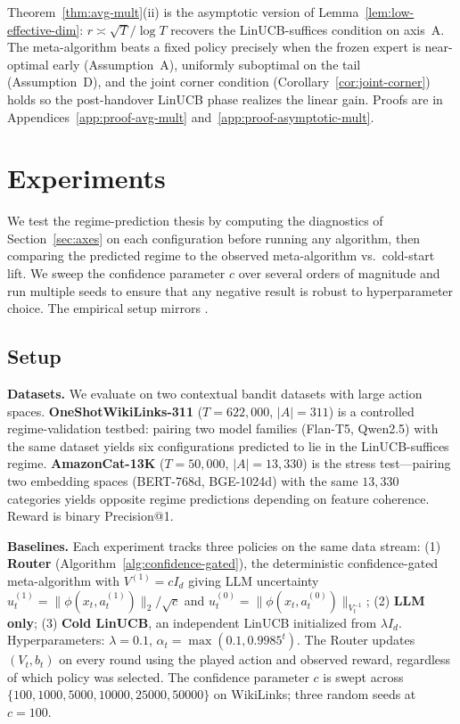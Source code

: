 \documentclass{article}
\theoremstyle{definition}
\theoremstyle{remark}
\theoremstyle{remark}
\begin{document}
Theorem~\ref{thm:avg-mult}(ii) is the asymptotic version of
Lemma~\ref{lem:low-effective-dim}: $r\!\asymp\!\sqrt T/\log T$ recovers the
LinUCB-suffices condition on axis~A. The meta-algorithm beats a fixed
policy precisely when the frozen expert is near-optimal early
(Assumption~A), uniformly suboptimal on the tail (Assumption~D), and the
joint corner condition (Corollary~\ref{cor:joint-corner}) holds so the
post-handover LinUCB phase realizes the linear gain. Proofs are in
Appendices~\ref{app:proof-avg-mult} and~\ref{app:proof-asymptotic-mult}.


\section{Experiments}
\label{sec:experiments}

We test the regime-prediction thesis by computing the diagnostics of
Section~\ref{sec:axes} on each configuration before running any algorithm,
then comparing the predicted regime to the observed meta-algorithm vs.\
cold-start lift. We sweep the confidence parameter $c$ over several orders
of magnitude and run multiple seeds to ensure that any negative result is
robust to hyperparameter choice. The empirical setup mirrors
\cite{chen2024llmdecision}.

\subsection{Setup}
\label{sec:exp-setup}

\textbf{Datasets.} We evaluate on two contextual bandit datasets with large
action spaces. \textbf{OneShotWikiLinks-311} ($T\!=\!622{,}000$,
$|A|\!=\!311$) is a controlled regime-validation testbed: pairing two model
families (Flan-T5, Qwen2.5) with the same dataset yields six configurations
predicted to lie in the LinUCB-suffices regime.
\textbf{AmazonCat-13K} ($T\!=\!50{,}000$, $|A|\!=\!13{,}330$) is the stress
test---pairing two embedding spaces (BERT-768d, BGE-1024d) with the same
$13{,}330$ categories yields opposite regime predictions depending on
feature coherence. Reward is binary Precision@1.

\textbf{Baselines.} Each experiment tracks three policies on the same data
stream: (1) \textbf{Router} (Algorithm~\ref{alg:confidence-gated}), the
deterministic confidence-gated meta-algorithm with $V^{(1)}=cI_d$ giving LLM
uncertainty $u_t^{(1)}=\|\phi(x_t,a_t^{(1)})\|_2/\sqrt c$ and
$u_t^{(0)}=\|\phi(x_t,a_t^{(0)})\|_{V_t^{-1}}$;
(2) \textbf{LLM only}; (3) \textbf{Cold LinUCB}, an independent LinUCB
initialized from $\lambda I_d$. Hyperparameters: $\lambda=0.1$,
$\alpha_t=\max(0.1, 0.9985^t)$. The Router updates $(V_t,b_t)$ on every round
using the played action and observed reward, regardless of which policy was
selected. The confidence parameter $c$ is swept across
$\{100, 1000, 5000, 10000, 25000, 50000\}$ on WikiLinks; three random seeds
at $c=100$.
\end{document}
